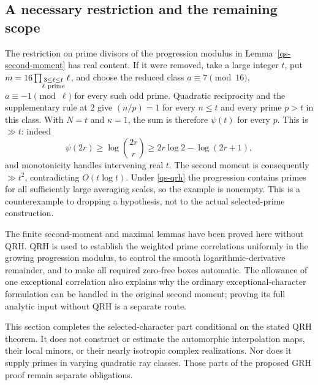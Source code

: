 \subsection{A necessary restriction and the remaining scope}

The restriction on prime divisors of the progression modulus in
Lemma~\ref{qs-second-moment} has real content. If it were removed,
take a large integer $t$, put
$m=16\prod_{\substack{3\le\ell\le t\\\ell\ {\rm prime}}}\ell$,
and choose the reduced class
$a\equiv7\pmod{16}$, $a\equiv-1\pmod\ell$ for every such
odd prime. Quadratic reciprocity and the supplementary rule at
$2$ give $(n/p)=1$ for every $n\le t$ and every prime $p>t$
in this class. With $N=t$ and $\kappa=1$, the sum is therefore
$\psi(t)$ for every $p$. This is $\gg t$: indeed
\[
 \psi(2r)\ge\log\binom{2r}{r}
       \ge2r\log2-\log(2r+1),
\]
and monotonicity handles intervening real $t$.
The second moment is consequently $\gg t^2$, contradicting
$O(t\log t)$. Under \eqref{qs-qrh} the progression contains
primes for all sufficiently large averaging scales, so the
example is nonempty. This is a counterexample to dropping a
hypothesis, not to the actual selected-prime construction.

The finite second-moment and maximal lemmas have been proved here
without QRH. QRH is used to establish the weighted prime
correlations uniformly in the growing progression modulus, to
control the smooth logarithmic-derivative remainder, and to make
all required zero-free boxes automatic. The allowance of one
exceptional correlation also explains why the ordinary
exceptional-character formulation can be handled in the original
second moment; proving its full analytic input without QRH is a
separate route.

This section completes the selected-character part conditional on
the stated QRH theorem. It does not construct or estimate the
automorphic interpolation maps, their local minors, or their
nearly isotropic complex realizations. Nor does it supply primes
in varying quadratic ray classes. Those parts of the proposed
GRH proof remain separate obligations.



